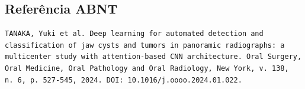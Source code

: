 \subsection{Referência ABNT}
\begin{verbatim}
TANAKA, Yuki et al. Deep learning for automated detection and
classification of jaw cysts and tumors in panoramic radiographs: a
multicenter study with attention-based CNN architecture. Oral Surgery,
Oral Medicine, Oral Pathology and Oral Radiology, New York, v. 138,
n. 6, p. 527-545, 2024. DOI: 10.1016/j.oooo.2024.01.022.
\end{verbatim}
\endinput
